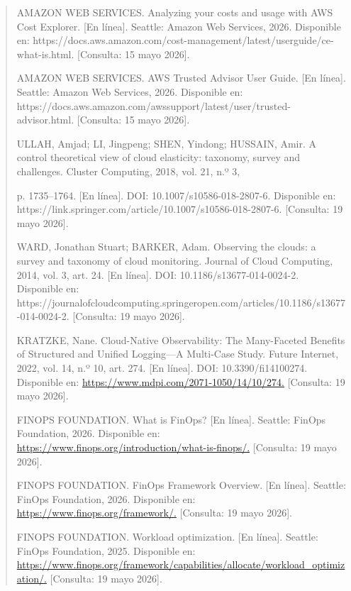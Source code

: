 \documentclass[
]{article}
\begin{document}
\begin{quote}
AMAZON WEB SERVICES. Analyzing your costs and usage with AWS Cost
Explorer. {[}En línea{]}. Seattle: Amazon Web Services, 2026. Disponible
en:
https://docs.aws.amazon.com/cost-management/latest/userguide/ce-what-is.html.
{[}Consulta: 15 mayo 2026{]}.

AMAZON WEB SERVICES. AWS Trusted Advisor User Guide. {[}En línea{]}.
Seattle: Amazon Web Services, 2026. Disponible en:
https://docs.aws.amazon.com/awssupport/latest/user/trusted-advisor.html.
{[}Consulta: 15 mayo 2026{]}.

ULLAH, Amjad; LI, Jingpeng; SHEN, Yindong; HUSSAIN, Amir. A control
theoretical view of cloud elasticity: taxonomy, survey and challenges.
Cluster Computing, 2018, vol. 21, n.º 3,

p. 1735--1764. {[}En línea{]}. DOI: 10.1007/s10586-018-2807-6.
Disponible en:
https://link.springer.com/article/10.1007/s10586-018-2807-6.
{[}Consulta: 19 mayo 2026{]}.

WARD, Jonathan Stuart; BARKER, Adam. Observing the clouds: a survey and
taxonomy of cloud monitoring. Journal of Cloud Computing, 2014, vol. 3,
art. 24. {[}En línea{]}. DOI: 10.1186/s13677-014-0024-2. Disponible en:
https://journalofcloudcomputing.springeropen.com/articles/10.1186/s13677-014-0024-2.
{[}Consulta: 19 mayo 2026{]}.

KRATZKE, Nane. Cloud-Native Observability: The Many-Faceted Benefits of
Structured and Unified Logging---A Multi-Case Study. Future Internet,
2022, vol. 14, n.º 10, art. 274. {[}En línea{]}. DOI:
10.3390/fi14100274. Disponible en:
\href{http://www.mdpi.com/2071-1050/14/10/274}{https://www.mdpi.com/2071-1050/14/10/274.}
{[}Consulta: 19 mayo 2026{]}.

FINOPS FOUNDATION. What is FinOps? {[}En línea{]}. Seattle: FinOps
Foundation, 2026. Disponible en:
\href{http://www.finops.org/introduction/what-is-finops/}{https://www.finops.org/introduction/what-is-finops/.}
{[}Consulta: 19 mayo 2026{]}.

FINOPS FOUNDATION. FinOps Framework Overview. {[}En línea{]}. Seattle:
FinOps Foundation, 2026. Disponible en:
\href{http://www.finops.org/framework/}{https://www.finops.org/framework/.}
{[}Consulta: 19 mayo 2026{]}.

FINOPS FOUNDATION. Workload optimization. {[}En línea{]}. Seattle:
FinOps Foundation, 2025. Disponible en:
\href{http://www.finops.org/framework/capabilities/allocate/workload_optimization/}{https://www.finops.org/framework/capabilities/allocate/workload\_optimization/.}
{[}Consulta: 19 mayo 2026{]}.


\end{quote}
\end{document}
